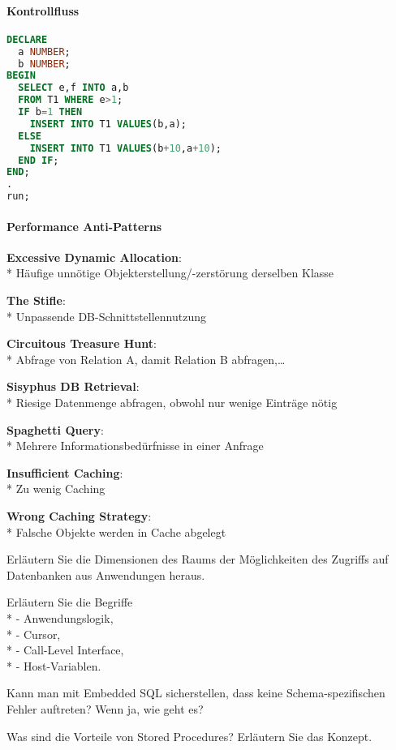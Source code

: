 \paragraph{Kontrollfluss}
\begin{items}
	\item
	\begin{lstlisting}[language=sql]
DECLARE
  a NUMBER;
  b NUMBER;
BEGIN
  SELECT e,f INTO a,b
  FROM T1 WHERE e>1;
  IF b=1 THEN
    INSERT INTO T1 VALUES(b,a);
  ELSE
    INSERT INTO T1 VALUES(b+10,a+10);
  END IF;
END;
.
run;
	\end{lstlisting}
\end{items}

\paragraph{Performance Anti-Patterns}
\begin{items}
	\item \textbf{Excessive Dynamic Allocation}:
		\\*
		Häufige unnötige Objekterstellung/-zerstörung derselben Klasse
	\item \textbf{The Stifle}:
		\\*
		Unpassende DB-Schnittstellennutzung
	\item \textbf{Circuitous Treasure Hunt}:
		\\*
		Abfrage von Relation A, damit Relation B abfragen,\dots
	\item \textbf{Sisyphus DB Retrieval}:
		\\*
		Riesige Datenmenge abfragen, obwohl nur wenige Einträge nötig
	\item \textbf{Spaghetti Query}:
		\\*
		Mehrere Informationsbedürfnisse in einer Anfrage
	\item \textbf{Insufficient Caching}:
		\\*
		Zu wenig Caching
	\item \textbf{Wrong Caching Strategy}:
		\\*
		Falsche Objekte werden in Cache abgelegt
\end{items}

\begin{fragen}
	\item Erläutern Sie die Dimensionen des Raums der Möglichkeiten des Zugriffs auf Datenbanken aus Anwendungen heraus.
	\item Erläutern Sie die Begriffe \\*
		- Anwendungslogik, \\*
		- Cursor, \\*
		- Call-Level Interface, \\*
		- Host-Variablen.
	\item Kann man mit Embedded SQL sicherstellen, dass keine Schema-spezifischen Fehler auftreten? Wenn ja, wie geht es?
	\item Was sind die Vorteile von Stored Procedures? Erläutern Sie das Konzept.
\end{fragen}